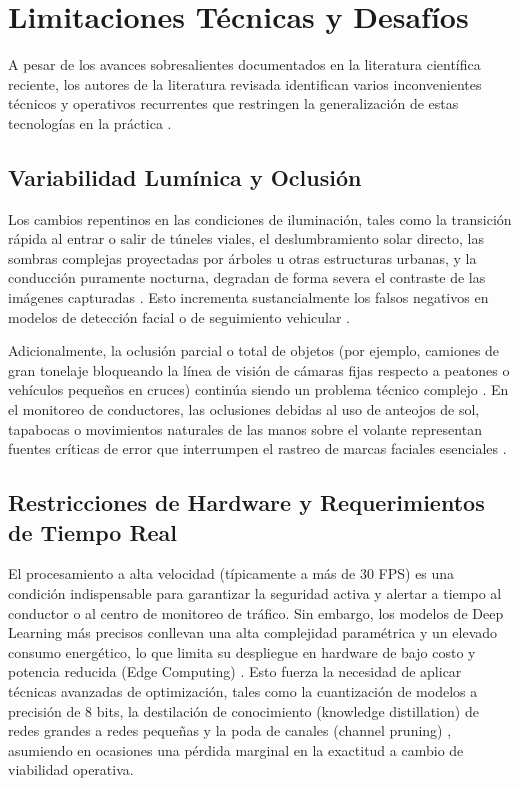 \section{Limitaciones Técnicas y Desafíos}
A pesar de los avances sobresalientes documentados en la literatura científica reciente, los autores de la literatura revisada identifican varios inconvenientes técnicos y operativos recurrentes que restringen la generalización de estas tecnologías en la práctica \cite{huang2025dtldetector, alshehri2025integrated, xie2025yoloace}.

\subsection{Variabilidad Lumínica y Oclusión}
Los cambios repentinos en las condiciones de iluminación, tales como la transición rápida al entrar o salir de túneles viales, el deslumbramiento solar directo, las sombras complejas proyectadas por árboles u otras estructuras urbanas, y la conducción puramente nocturna, degradan de forma severa el contraste de las imágenes capturadas \cite{mota2025integration, kavitha2025towards}. Esto incrementa sustancialmente los falsos negativos en modelos de detección facial o de seguimiento vehicular \cite{salakapuri2025integrated, rachoti2025traffic}. 

Adicionalmente, la oclusión parcial o total de objetos (por ejemplo, camiones de gran tonelaje bloqueando la línea de visión de cámaras fijas respecto a peatones o vehículos pequeños en cruces) continúa siendo un problema técnico complejo \cite{elhenidy2025gyyolo, mota2025integration}. En el monitoreo de conductores, las oclusiones debidas al uso de anteojos de sol, tapabocas o movimientos naturales de las manos sobre el volante representan fuentes críticas de error que interrumpen el rastreo de marcas faciales esenciales \cite{silva2025light, deshpande2025computervision}.

\subsection{Restricciones de Hardware y Requerimientos de Tiempo Real}
El procesamiento a alta velocidad (típicamente a más de 30 FPS) es una condición indispensable para garantizar la seguridad activa y alertar a tiempo al conductor o al centro de monitoreo de tráfico. Sin embargo, los modelos de Deep Learning más precisos conllevan una alta complejidad paramétrica y un elevado consumo energético, lo que limita su despliegue en hardware de bajo costo y potencia reducida (Edge Computing) \cite{komol2024prediction, hernandez2024realtime}. Esto fuerza la necesidad de aplicar técnicas avanzadas de optimización, tales como la cuantización de modelos a precisión de 8 bits, la destilación de conocimiento (knowledge distillation) de redes grandes a redes pequeñas y la poda de canales (channel pruning) \cite{abdullah2025lcyolo, bhaskara2025deep}, asumiendo en ocasiones una pérdida marginal en la exactitud a cambio de viabilidad operativa.

